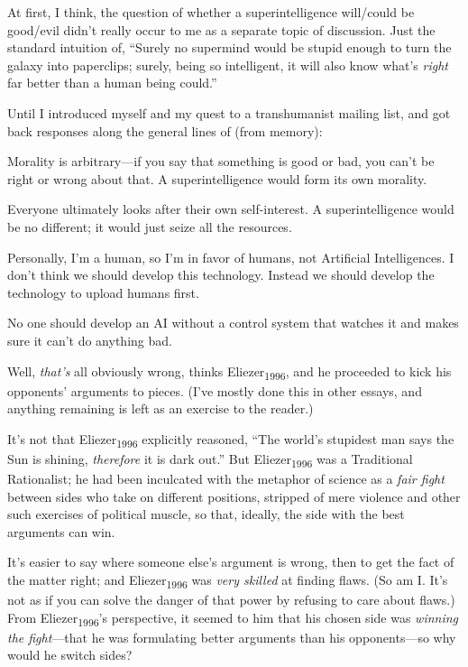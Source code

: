{
 At first, I think, the question of whether a superintelligence
will/could be good/evil didn't really occur to me as a
separate topic of discussion. Just the standard intuition of,
``Surely no supermind would be stupid enough to turn
the galaxy into paperclips; surely, being so intelligent, it will also
know what's \textit{right} far better than a human
being could.''}

{
 Until I introduced myself and my quest to a transhumanist mailing
list, and got back responses along the general lines of (from memory):}

{
 Morality is arbitrary---if you say that something is good or bad,
you can't be right or wrong about that. A
superintelligence would form its own morality.}

{
 Everyone ultimately looks after their own self-interest. A
superintelligence would be no different; it would just seize all the
resources.}

{
 Personally, I'm a human, so I'm in
favor of humans, not Artificial Intelligences. I don't
think we should develop this technology. Instead we should develop the
technology to upload humans first.}

{
 No one should develop an AI without a control system that watches
it and makes sure it can't do anything bad.}

{
 Well, \textit{that's} all obviously wrong, thinks
Eliezer\textsubscript{1996}, and he proceeded to kick his
opponents' arguments to pieces. (I've
mostly done this in other essays, and anything remaining is left as an
exercise to the reader.)}

{
 It's not that Eliezer\textsubscript{1996}
explicitly reasoned, ``The world's
stupidest man says the Sun is shining, \textit{therefore} it is dark
out.'' But Eliezer\textsubscript{1996} was a
Traditional Rationalist; he had been inculcated with the metaphor of
science as a \textit{fair fight} between sides who take on different
positions, stripped of mere violence and other such exercises of
political muscle, so that, ideally, the side with the best arguments
can win.}

{
 It's easier to say where someone
else's argument is wrong, then to get the fact of the
matter right; and Eliezer\textsubscript{1996} was \textit{very skilled}
at finding flaws. (So am I. It's not as if you can
solve the danger of that power by refusing to care about flaws.) From
Eliezer\textsubscript{1996}'s perspective, it seemed to
him that his chosen side was \textit{winning the fight}{}---that he was
formulating better arguments than his opponents---so why would he
switch sides?}

